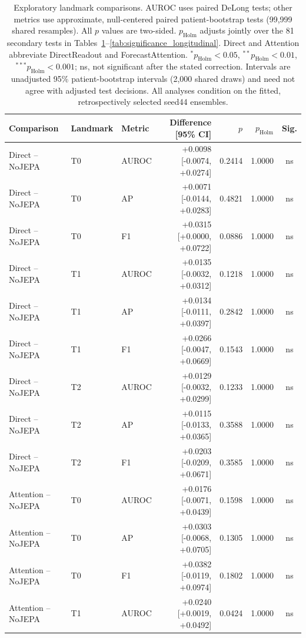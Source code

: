 \begin{table}[t]
\centering
\small
\caption{Exploratory landmark comparisons. AUROC uses paired DeLong tests; other metrics use approximate, null-centered paired patient-bootstrap tests (99,999 shared resamples). All $p$ values are two-sided. $p_{\mathrm{Holm}}$ adjusts jointly over the 81 secondary tests in Tables~\ref{tab:significance_landmarks}--\ref{tab:significance_longitudinal}. Direct and Attention abbreviate DirectReadout and ForecastAttention. $^{*}p_{\mathrm{Holm}}<0.05$, $^{**}p_{\mathrm{Holm}}<0.01$, $^{***}p_{\mathrm{Holm}}<0.001$; ns, not significant after the stated correction. Intervals are unadjusted 95\% patient-bootstrap intervals (2,000 shared draws) and need not agree with adjusted test decisions. All analyses condition on the fitted, retrospectively selected seed44 ensembles.}
\label{tab:significance_landmarks}
\begin{tabular}{lllrrrc}
\toprule
Comparison & Landmark & Metric & Difference [95\% CI] & $p$ & $p_{\mathrm{Holm}}$ & Sig. \\
\midrule
Direct -- NoJEPA & T0 & AUROC & +0.0098 [-0.0074, +0.0274] & 0.2414 & 1.0000 & ns \\
Direct -- NoJEPA & T0 & AP & +0.0071 [-0.0144, +0.0283] & 0.4821 & 1.0000 & ns \\
Direct -- NoJEPA & T0 & F1 & +0.0315 [+0.0000, +0.0722] & 0.0886 & 1.0000 & ns \\
Direct -- NoJEPA & T1 & AUROC & +0.0135 [-0.0032, +0.0312] & 0.1218 & 1.0000 & ns \\
Direct -- NoJEPA & T1 & AP & +0.0134 [-0.0111, +0.0397] & 0.2842 & 1.0000 & ns \\
Direct -- NoJEPA & T1 & F1 & +0.0266 [-0.0047, +0.0669] & 0.1543 & 1.0000 & ns \\
Direct -- NoJEPA & T2 & AUROC & +0.0129 [-0.0032, +0.0299] & 0.1233 & 1.0000 & ns \\
Direct -- NoJEPA & T2 & AP & +0.0115 [-0.0133, +0.0365] & 0.3588 & 1.0000 & ns \\
Direct -- NoJEPA & T2 & F1 & +0.0203 [-0.0209, +0.0671] & 0.3585 & 1.0000 & ns \\
Attention -- NoJEPA & T0 & AUROC & +0.0176 [-0.0071, +0.0439] & 0.1598 & 1.0000 & ns \\
Attention -- NoJEPA & T0 & AP & +0.0303 [-0.0068, +0.0705] & 0.1305 & 1.0000 & ns \\
Attention -- NoJEPA & T0 & F1 & +0.0382 [-0.0119, +0.0974] & 0.1802 & 1.0000 & ns \\
Attention -- NoJEPA & T1 & AUROC & +0.0240 [+0.0019, +0.0492] & 0.0424 & 1.0000 & ns \\

\end{tabular}
\end{table}
